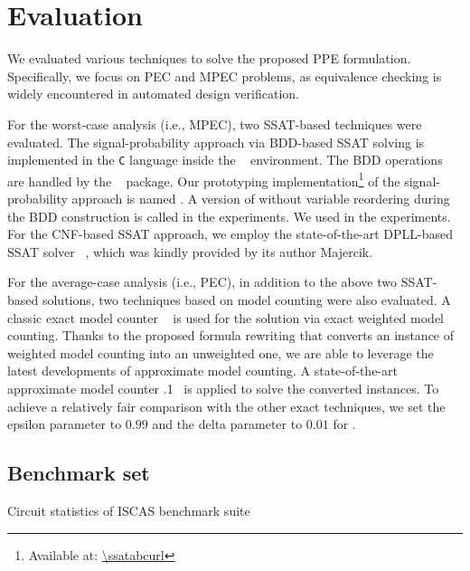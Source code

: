 \section{Evaluation}
\label{sect:prob-evaluation}

We evaluated various techniques to solve the proposed PPE formulation.
Specifically, we focus on PEC and MPEC problems,
as equivalence checking is widely encountered in automated design verification.

For the worst-case analysis (i.e., MPEC), two SSAT-based techniques were evaluated.
The signal-probability approach via BDD-based SSAT solving
is implemented in the \texttt{C} language inside the \abc~\cite{ABC} environment.
The BDD operations are handled by the \cudd~\cite{CUDD} package.
Our prototyping implementation\footnote{Available at: \url{\ssatabcurl}}
of the signal-probability approach is named \bddsp.
A version of \bddsp without variable reordering during the BDD construction
is called \bddspnr in the experiments.
We used \ssatABCRevision in the experiments.
For the CNF-based SSAT approach,
we employ the state-of-the-art DPLL-based SSAT solver \dcssat~\cite{Majercik2005},
which was kindly provided by its author Majercik.

For the average-case analysis (i.e., PEC),
in addition to the above two SSAT-based solutions,
two techniques based on model counting were also evaluated.
A classic exact model counter \cachet~\cite{Sang2004,Sang2005ModelCounting} is used
for the solution via exact weighted model counting.
Thanks to the proposed formula rewriting
that converts an instance of weighted model counting into an unweighted one,
we are able to leverage the latest developments of approximate model counting.
A state-of-the-art approximate model counter .1~\cite{Chakraborty2013,Chakraborty2016}
is applied to solve the converted instances.
To achieve a relatively fair comparison with the other exact techniques,
we set the epsilon parameter to $0.99$ and the delta parameter to $0.01$ for \approxmc.

\subsection{Benchmark set}
\begin{table}[ht]
    \centering
    \footnotesize
    \caption{Circuit statistics of ISCAS benchmark suite}
    \label{tbl:prob-design-eval-iscas}
\end{table}


